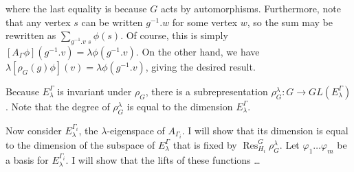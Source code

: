 where the last equality is because $G$ acts by automorphisms. Furthermore, note that any vertex $s$ can be written $g^{-1}.w$ for some vertex $w$, so the sum may be rewritten as $\sum_{g^{-1}.v \text{~} s} \phi(s)$. Of course, this is simply $[A_\Gamma \phi](g^{-1}.v) = \lambda \phi(g^{-1}.v)$. On the other hand, we have $\lambda [\rho_G(g)\phi](v) = \lambda \phi(g^{-1}.v)$, giving the desired result.

Because $E_{\lambda}^{\Gamma}$ is invariant under $\rho_G$, there is a subrepresentation $\rho_G^\lambda : G \to GL(E_{\lambda}^{\Gamma})$. Note that the degree of $\rho_G^\lambda$ is equal to the dimension $E_{\lambda}^{\Gamma}$. 

Now consider $E_{\lambda}^{\Gamma_i}$, the $\lambda$-eigenspace of $A_{\Gamma_i}$. I will show that its dimension is equal to the dimension of the subspace of $E_{\lambda}^{\Gamma}$ that is fixed by $\operatorname{Res}_{H_i}^G \rho_G^\lambda$. Let $\varphi_1 \ldots \varphi_m$ be a basis for $E_{\lambda}^{\Gamma_i}$. I will show that the lifts of these functions \ldots